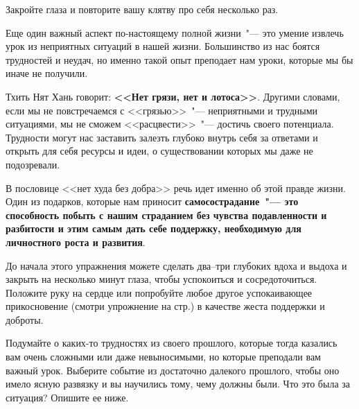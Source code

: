 \begin{center}
	{\large Закройте глаза и повторите вашу клятву про себя несколько раз.}
\end{center}

\vspace{3ex}


\newpage
{} \label{Ex:Silver_Linings}

Еще один важный аспект по-настоящему полной жизни~"--- это умение извлечь урок из неприятных ситуаций в нашей жизни. Большинство из нас боятся трудностей и неудач, но именно такой опыт преподает нам уроки, которые мы бы иначе не получили.

Тхить Нят Хань говорит: \textbf{<<Нет грязи, нет и лотоса>>}\cite{84}. Другими словами, если мы не повстречаемся с <<грязью>>~"--- неприятными и трудными ситуациями, мы не сможем <<расцвести>>~"--- достичь своего потенциала. Трудности могут нас заставить залезть глубоко внутрь себя за ответами и открыть для себя ресурсы и идеи, о существовании которых мы даже не подозревали. 

В пословице <<нет худа без добра>> речь идет именно об этой правде жизни. Один из подарков, которые нам приносит \textbf{самосострадание~"--- это способность побыть с нашим страданием без чувства подавленности и разбитости и этим самым дать себе поддержку, необходимую для личностного роста и развития}. 

До начала этого упражнения можете сделать два--три глубоких вдоха и выдоха и закрыть на несколько минут глаза, чтобы успокоиться и сосредоточиться. Положите руку на сердце или попробуйте любое другое успокаивающее прикосновение (смотри упрожнение на стр.\:\pageref{IP:Soothing_Touch}) в качестве жеста поддержки и доброты. 

\begin{itemize}
	\itemWritingHand Подумайте о каких-то трудностях из своего прошлого, которые тогда казались вам очень сложными или даже невыносимыми, но которые преподали вам важный урок. Выберите событие из достаточно далекого прошлого, чтобы оно имело ясную развязку и вы научились тому, чему должны были. Что это была за ситуация? Опишите ее ниже. 
\end{itemize}

